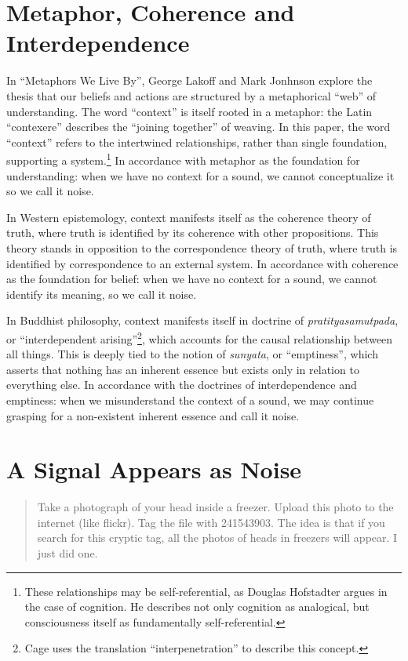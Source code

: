 \documentclass{thesis}
\begin{document}
\section{Metaphor, Coherence and Interdependence}

In ``Metaphors We Live By'', George Lakoff and Mark Jonhnson explore the thesis that our beliefs and actions are structured by a metaphorical ``web'' of understanding. The word ``context'' is itself rooted in a metaphor: the Latin ``contexere'' describes the ``joining together'' of weaving. In this paper, the word ``context'' refers to the intertwined relationships, rather than single foundation, supporting a system.\footnote{These relationships may be self-referential, as Douglas Hofstadter argues in the case of cognition.\cite{Hofstadter01} He describes not only cognition as analogical, but consciousness itself as fundamentally self-referential\cite{Hofstadter07}.} In accordance with metaphor as the foundation for understanding: when we have no context for a sound, we cannot conceptualize it so we call it noise.

In Western epistemology, context manifests itself as the coherence theory of truth\cite{Blackburn07}\cite{young_coherence_????}, where truth is identified by its coherence with other propositions. This theory stands in opposition to the correspondence\cite{david_correspondence_????} theory of truth, where truth is identified by correspondence to an external system. In accordance with coherence as the foundation for belief: when we have no context for a sound, we cannot identify its meaning, so we call it noise.

In Buddhist philosophy, context manifests itself in doctrine of \emph{pratityasamutpada}, or ``interdependent arising''\footnote{Cage uses the translation ``interpenetration'' to describe this concept.}, which accounts for the causal relationship between all things.\cite{Koller01} This is deeply tied to the notion of \emph{sunyata}, or ``emptiness'', which asserts that nothing has an inherent essence but exists only in relation to everything else. In accordance with the doctrines of interdependence and emptiness: when we misunderstand the context of a sound, we may continue grasping for a non-existent inherent essence and call it noise.

\section{A Signal Appears as Noise}

\begin{quote}
Take a photograph of your head inside a freezer. Upload this photo to the internet (like flickr). Tag the file with 241543903. The idea is that if you search for this cryptic tag, all the photos of heads in freezers will appear. I just did one.\cite{david_horvitz_flickr:_????-1}
\end{quote}
\end{document}
